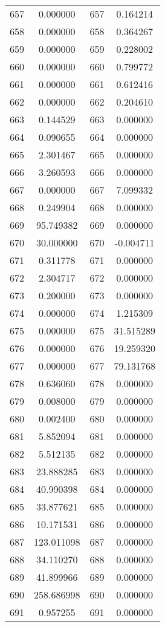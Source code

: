\documentclass[12pt]{article}
\begin{document}
\begin{longtable}{@{}cccc@{}}
657 & 0.000000 & 657 & 0.164214 \\
658 & 0.000000 & 658 & 0.364267 \\
659 & 0.000000 & 659 & 0.228002 \\
660 & 0.000000 & 660 & 0.799772 \\
661 & 0.000000 & 661 & 0.612416 \\
662 & 0.000000 & 662 & 0.204610 \\
663 & 0.144529 & 663 & 0.000000 \\
664 & 0.090655 & 664 & 0.000000 \\
665 & 2.301467 & 665 & 0.000000 \\
666 & 3.260593 & 666 & 0.000000 \\
667 & 0.000000 & 667 & 7.099332 \\
668 & 0.249904 & 668 & 0.000000 \\
669 & 95.749382 & 669 & 0.000000 \\
670 & 30.000000 & 670 & -0.004711 \\
671 & 0.311778 & 671 & 0.000000 \\
672 & 2.304717 & 672 & 0.000000 \\
673 & 0.200000 & 673 & 0.000000 \\
674 & 0.000000 & 674 & 1.215309 \\
675 & 0.000000 & 675 & 31.515289 \\
676 & 0.000000 & 676 & 19.259320 \\
677 & 0.000000 & 677 & 79.131768 \\
678 & 0.636060 & 678 & 0.000000 \\
679 & 0.008000 & 679 & 0.000000 \\
680 & 0.002400 & 680 & 0.000000 \\
681 & 5.852094 & 681 & 0.000000 \\
682 & 5.512135 & 682 & 0.000000 \\
683 & 23.888285 & 683 & 0.000000 \\
684 & 40.990398 & 684 & 0.000000 \\
685 & 33.877621 & 685 & 0.000000 \\
686 & 10.171531 & 686 & 0.000000 \\
687 & 123.011098 & 687 & 0.000000 \\
688 & 34.110270 & 688 & 0.000000 \\
689 & 41.899966 & 689 & 0.000000 \\
690 & 258.686998 & 690 & 0.000000 \\
691 & 0.957255 & 691 & 0.000000 \\

\end{longtable}
\end{document}
